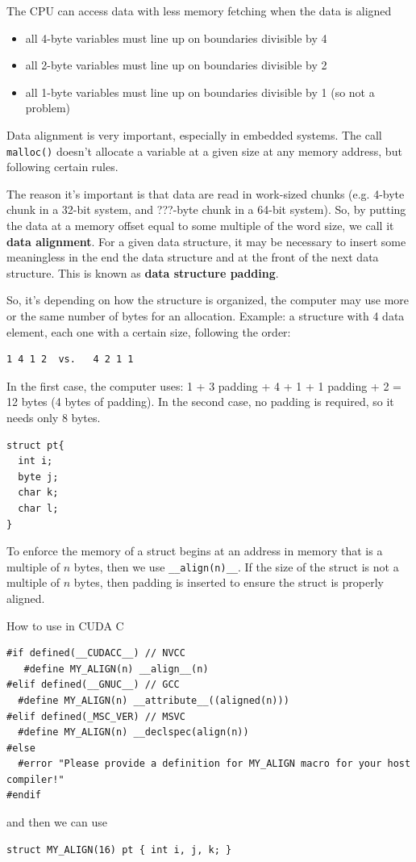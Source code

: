 The CPU can access data with less memory fetching when the data is aligned
\begin{itemize}
  \item all 4-byte variables must line up on boundaries divisible by 4
  \item all 2-byte variables must line up on boundaries divisible by 2
  \item all 1-byte variables must line up on boundaries divisible by 1 (so not
  a problem)
\end{itemize}
Data alignment is very important, especially in embedded systems. The call
\verb!malloc()! doesn't allocate a variable at a given size at any memory
address, but following certain rules.

The reason it's important is that data are read in work-sized chunks (e.g.
4-byte chunk in a 32-bit system, and ???-byte chunk in a 64-bit system). So, by
putting the data at a memory offset equal to some multiple of the word size, we
call it {\bf data alignment}. For a given data structure, it may be necessary to
insert some meaningless in the end the data structure and at the front of the
next data structure. This is known as {\bf data structure padding}. 

So, it's depending on how the structure is organized, the computer may use more
or the same number of bytes for an allocation. Example: a structure with 4 data
element, each one with a certain size, following the order: 
\begin{verbatim}
1 4 1 2  vs.   4 2 1 1
\end{verbatim}
In the first case, the computer uses: 1 + 3 padding + 4 + 1 + 1 padding + 2 = 12
bytes (4 bytes of padding). In the second case, no padding is required, so it
needs only 8 bytes.
\begin{lstlisting}
struct pt{
  int i;
  byte j;
  char k;
  char l;
}
\end{lstlisting}

To enforce the memory of a struct begins at an address in memory that is a
multiple of $n$ bytes, then we use \verb!__align(n)__!. If the size of the
struct is not a multiple of $n$ bytes, then padding is inserted to ensure the
struct is properly aligned. 

How to use in CUDA C
\begin{lstlisting}
#if defined(__CUDACC__) // NVCC
   #define MY_ALIGN(n) __align__(n)
#elif defined(__GNUC__) // GCC
  #define MY_ALIGN(n) __attribute__((aligned(n)))
#elif defined(_MSC_VER) // MSVC
  #define MY_ALIGN(n) __declspec(align(n))
#else
  #error "Please provide a definition for MY_ALIGN macro for your host compiler!"
#endif
\end{lstlisting}
and then we can use
\begin{lstlisting}
struct MY_ALIGN(16) pt { int i, j, k; }
\end{lstlisting}

